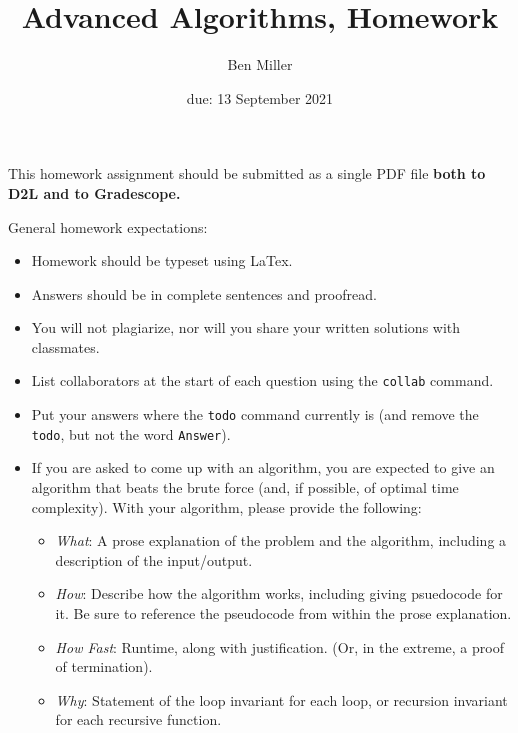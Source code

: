 \documentclass{article}
\title{Advanced Algorithms, Homework \hwnum}
\author{Ben Miller}
\date{due: 13 September 2021}
\begin{document}
\maketitle

This homework assignment should be
submitted as a single PDF file {\bf both to D2L and to Gradescope.}

General homework expectations:
\begin{itemize}
      \item Homework should be typeset using LaTex.
      \item Answers should be in complete sentences and proofread.
      \item You will not plagiarize, nor will you share your written solutions
            with classmates.
      \item List collaborators at the start of each question using the
            \texttt{collab} command.
      \item Put your answers where the \texttt{todo} command currently is (and
            remove the \texttt{todo}, but not the word \texttt{Answer}).
      \item If you are asked to come up with an algorithm, you are
            expected to give an algorithm that beats the brute force (and, if possible, of
            optimal time complexity). With your algorithm, please provide the following:
            \begin{itemize}
                  \item \emph{What}: A prose explanation of the problem and the algorithm,
                        including a description of the input/output.
                  \item \emph{How}: Describe how the algorithm works, including giving
                        psuedocode for it.  Be sure to reference the pseudocode
                        from within the prose explanation.
                  \item \emph{How Fast}: Runtime, along with justification.  (Or, in the
                        extreme, a proof of termination).
                  \item \emph{Why}: Statement of the loop invariant for each loop, or
                        recursion invariant for each recursive function.
            \end{itemize}
\end{itemize}



\end{document}
